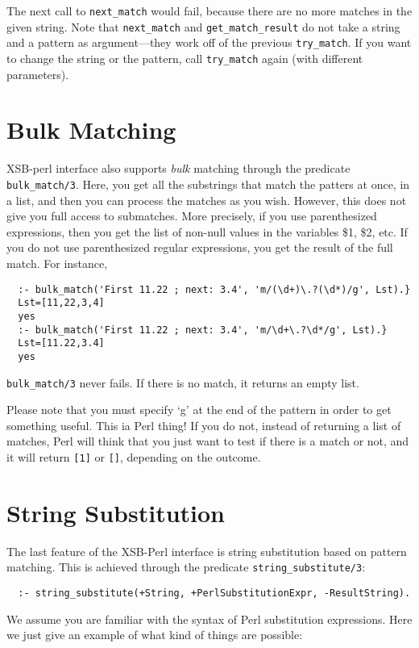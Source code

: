 The next call to {\tt next\_match}  would fail, because there are no more
matches in the given string. Note that {\tt next\_match} and
{\tt get\_match\_result} do not take a string and a pattern as
argument---they work off of the previous {\tt try\_match}. If you want to
change the string or the pattern, call {\tt try\_match} again (with
different parameters).

\section{Bulk Matching}
XSB-perl interface also supports {\em bulk\/} matching through the
predicate {\tt bulk\_match/3}. Here, you get all
the substrings that match the patters at once, in a list, and then you can
process the matches as you wish. However, this does not give you full
access to submatches. More precisely, if you use parenthesized expressions,
then you get the list of non-null values in the variables \$1, \$2, etc.
If you do not use parenthesized regular expressions, you get the result of
the full match. For instance,
\begin{verbatim}
  :- bulk_match('First 11.22 ; next: 3.4', 'm/(\d+)\.?(\d*)/g', Lst).}
  Lst=[11,22,3,4]
  yes
  :- bulk_match('First 11.22 ; next: 3.4', 'm/\d+\.?\d*/g', Lst).}
  Lst=[11.22,3.4]
  yes
\end{verbatim}
{\tt bulk\_match/3} never fails. If there is no match, it returns an empty
list. 

Please note that you must specify `g' at the end of the pattern in order to
get something useful. This ia Perl thing! If you do not, instead of
returning a list of matches, Perl will think that you just want to test if
there is a match or not, and it will return \verb|[1]| or \verb|[]|,
depending on the outcome.

\section{String Substitution}
The last feature of the XSB-Perl interface is string substitution based on
pattern matching. This is achieved through the predicate
{\tt string\_substitute/3}: 

\begin{verbatim}
  :- string_substitute(+String, +PerlSubstitutionExpr, -ResultString).
\end{verbatim}

We assume you are familiar with the syntax of Perl substitution
expressions. Here we just give an example of what kind of things are
possible:

